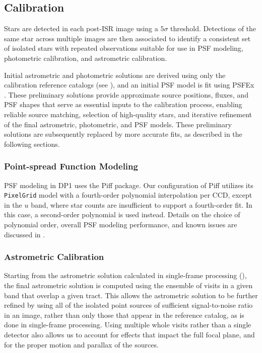 \subsection{Calibration}
\label{ssec:drp_calibration}
Stars are detected in each post-\gls{ISR} image using a $5\sigma$ threshold.
Detections of the same star across multiple images are then associated to identify a consistent set of isolated stars with repeated observations suitable for use in PSF modeling, photometric \gls{calibration}, and astrometric \gls{calibration}.

Initial astrometric and photometric solutions are derived using only the calibration reference catalogs (see ), and an initial \gls{PSF} model is fit using PSFEx \citep[][]{2011ASPC..442..435B}.
These preliminary solutions provide approximate source positions, fluxes, and \gls{PSF} shapes that serve as essential inputs to the \gls{calibration} process, enabling reliable source matching, selection of high-quality stars, and iterative refinement of the final astrometric, photometric, and \gls{PSF} models.
These preliminary solutions are subsequently replaced by more accurate fits, as described in the following sections.

\subsubsection{Point-spread Function Modeling}
\label{ssec:psf_modelling}
\gls{PSF} modeling in \gls{DP1} uses the Piff \citep[][]{2021MNRAS.501.1282J} package.
Our configuration of Piff utilizes its \texttt{PixelGrid} model with a fourth-order polynomial interpolation per \gls{CCD}, except in the $u$ band, where star counts are insufficient to support a fourth-order fit.
In this case, a second-order polynomial is used instead.
Details on the choice of polynomial order, overall \gls{PSF} modeling performance, and known issues are discussed in .

\subsubsection{Astrometric Calibration}
\label{ssec:global_astrometric_calibration}
Starting from the astrometric solution calculated in single-frame processing (), the final astrometric solution is computed using the ensemble of visits in a given band that overlap a given \gls{tract}.
This allows the astrometric solution to be further refined by using all of the isolated point sources of sufficient signal-to-noise ratio in an image, rather than only those that appear in the reference catalog, as is done in single-frame processing.
Using multiple whole visits rather than a single detector also allows us to account for effects that impact the full focal plane, and for the proper motion and parallax of the sources.

